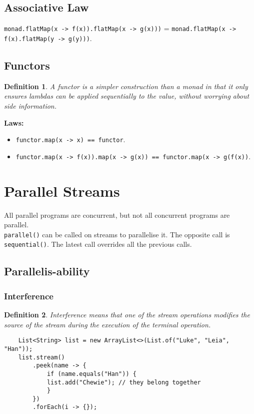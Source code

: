 \documentclass[10pt,landscape,a4paper]{article}
\newtheorem{definition}{Definition}[section]
\begin{document}
\begin{multicols*}{4}
\subsection{Associative Law}
\texttt{monad.flatMap(x -> f(x)).flatMap(x -> g(x)))} = \texttt{monad.flatMap(x -> f(x).flatMap(y -> g(y)))}.

\subsection{Functors}
\begin{definition}
     A functor is a simpler construction than a monad in that it only ensures lambdas can be applied sequentially to the value, without worrying about side information.
\end{definition}
\textbf{Laws:}
\begin{itemize}
    \item \texttt{functor.map(x -> x) == functor}.
    \item \texttt{functor.map(x -> f(x)).map(x -> g(x)) == functor.map(x -> g(f(x))}.
\end{itemize}

\section{Parallel Streams}
All parallel programs are concurrent, but not all concurrent programs are parallel. \\
\texttt{parallel()} can be called on streams to parallelise it. The opposite call is \texttt{sequential()}. The latest call overrides all the previous calls.\\

\subsection{Parallelis-ability}
\subsubsection{Interference}
\begin{definition}
    Interference means that one of the stream operations modifies the source of the stream during the execution of the terminal operation.
\end{definition}

\begin{lstlisting}
    List<String> list = new ArrayList<>(List.of("Luke", "Leia", "Han"));
    list.stream()
        .peek(name -> {
            if (name.equals("Han")) {
            list.add("Chewie"); // they belong together
            }
        })
        .forEach(i -> {});
\end{lstlisting}


\end{multicols*}
\end{document}
